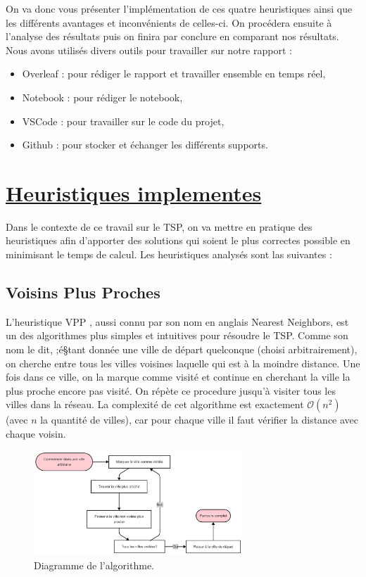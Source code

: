 \documentclass[a4paper,11pt,fleqn]{article}
\begin{document}
On va donc vous présenter l’implémentation de ces quatre heuristiques ainsi que les différents avantages et inconvénients de celles-ci. 
On procédera ensuite à l’analyse des résultats puis on finira par conclure en comparant nos résultats. \\
Nous avons utilisés divers outils pour travailler sur notre rapport :
\begin{itemize}
    \item Overleaf : pour rédiger le rapport et travailler ensemble en temps réel,
    \item Notebook : pour rédiger le notebook,
    \item VSCode : pour travailler sur le code du projet,
    \item Github : pour stocker et échanger les différents supports.
\end{itemize}

\section*{\underline{Heuristiques implementes}}
Dans le contexte de ce travail sur le TSP,  on va mettre en pratique des heuristiques afin d’apporter des solutions qui soient le plus correctes possible en minimisant le temps de calcul.
Les heuristiques analysés sont las suivantes :
\subsection*{Voisins Plus Proches}
L'heuristique VPP \cite{article:nearest}, aussi connu par son nom en anglais Nearest Neighbors, est un des algorithmes plus simples et intuitives pour résoudre le TSP. Comme son nom le dit, ;é§tant donnée une ville de départ quelconque (choisi arbitrairement), on cherche entre tous les villes voisines laquelle qui est à la moindre distance. Une fois dans ce ville, on la marque comme visité et continue en cherchant la ville la plus proche encore pas visité. On répète ce procedure jusqu'à visiter tous les villes dans la réseau. La complexité de cet algorithme est exactement $\mathcal{O}(n^2)$ (avec $n$ la quantité de villes), car pour chaque ville il faut vérifier la distance avec chaque voisin.

\begin{figure}[H]
    \centering
    \includegraphics[width=0.7\textwidth]{images/chart-nn.png}
    \caption{Diagramme de l'algorithme.}
    \label{fig:charte-nn}
\end{figure}
\end{document}
